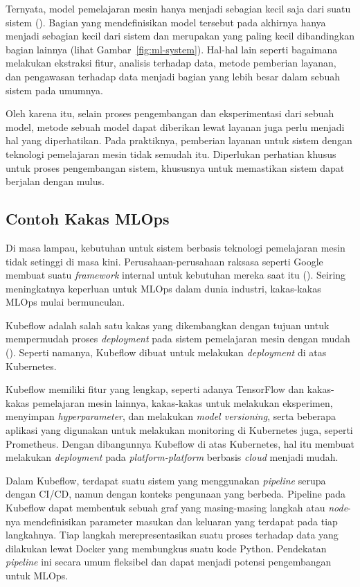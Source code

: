 Ternyata, model pemelajaran mesin hanya menjadi sebagian kecil saja dari suatu sistem (\cite{NIPS2015_86df7dcf}).
Bagian yang mendefinisikan model tersebut pada akhirnya hanya menjadi sebagian kecil dari sistem dan merupakan yang paling kecil dibandingkan bagian lainnya (lihat Gambar~\ref{fig:ml-system}).
Hal-hal lain seperti bagaimana melakukan ekstraksi fitur, analisis terhadap data, metode pemberian layanan, dan pengawasan terhadap data menjadi bagian yang lebih besar dalam sebuah sistem pada umumnya.

Oleh karena itu, selain proses pengembangan dan eksperimentasi dari sebuah model, metode sebuah model dapat diberikan lewat layanan juga perlu menjadi hal yang diperhatikan.
Pada praktiknya, pemberian layanan untuk sistem dengan teknologi pemelajaran mesin tidak semudah itu.
Diperlukan perhatian khusus untuk proses pengembangan sistem, khususnya untuk memastikan sistem dapat berjalan dengan mulus.

\subsection{Contoh Kakas MLOps}

Di masa lampau, kebutuhan untuk sistem berbasis teknologi pemelajaran mesin tidak setinggi di masa kini. 
Perusahaan-perusahaan raksasa seperti Google membuat suatu \textit{framework} internal untuk kebutuhan mereka saat itu (\cite{mlops}).
Seiring meningkatnya keperluan untuk MLOps dalam dunia industri, kakas-kakas MLOps mulai bermunculan.

Kubeflow adalah salah satu kakas yang dikembangkan dengan tujuan untuk mempermudah proses \textit{deployment} pada sistem pemelajaran mesin dengan mudah (\cite{k8s}).
Seperti namanya, Kubeflow dibuat untuk melakukan \textit{deployment} di atas Kubernetes.

Kubeflow memiliki fitur yang lengkap, seperti adanya TensorFlow dan kakas-kakas pemelajaran mesin lainnya, kakas-kakas untuk melakukan eksperimen, menyimpan \textit{hyperparameter}, dan melakukan \textit{model versioning}, serta beberapa aplikasi yang digunakan untuk melakukan monitoring di Kubernetes juga, seperti Prometheus.
Dengan dibangunnya Kubeflow di atas Kubernetes, hal itu membuat melakukan \textit{deployment} pada \textit{platform-platform} berbasis \textit{cloud} menjadi mudah.

Dalam Kubeflow, terdapat suatu sistem yang menggunakan \textit{pipeline} serupa dengan CI/CD, namun dengan konteks pengunaan yang berbeda.
Pipeline pada Kubeflow dapat membentuk sebuah graf yang masing-masing langkah atau \textit{node}-nya mendefinisikan parameter masukan dan keluaran yang terdapat pada tiap langkahnya.
Tiap langkah merepresentasikan suatu proses terhadap data yang dilakukan lewat Docker yang membungkus suatu kode Python.
Pendekatan \textit{pipeline} ini secara umum fleksibel dan dapat menjadi potensi pengembangan untuk MLOps.

